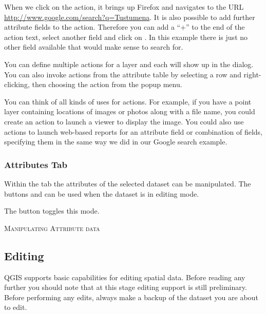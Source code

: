 When we click on the action, it brings up Firefox and navigates to the URL
\url{http://www.google.com/search?q=Tustumena}. It is also possible to add further 
attribute fields to the action. Therefore you can add a ``+'' to the end of the action 
text, select another field and click on . In this example there 
is just no other field available that would make sense to search for.

You can define multiple actions for a layer and each will show up in the
 dialog. You can also invoke actions from the attribute table
by selecting a row and right-clicking, then choosing the action from the popup
menu.

You can think of all kinds of uses for actions. For example, if you have a point layer
containing locations of images or photos along with a file name, you could
create an action to launch a viewer to display the image. You could also use
actions to launch web-based reports for an attribute field or combination of
fields, specifying them in the same way we did in our Google search example.

\subsubsection{Attributes Tab}\label{label_attributes}
Within the  tab the attributes of the selected dataset can be
manipulated. The buttons  and  can be
used when the dataset is in editing mode.

The button  toggles this mode.

\begin{Tip}[ht]\caption{\textsc{Manipulating Attribute data}}
\end{Tip}


\subsection{Editing}

QGIS supports basic capabilities for editing spatial data.  Before reading any
further you should note that at this stage editing support is still preliminary.
Before performing any edits, always make a backup of the dataset you are about
to edit. 


